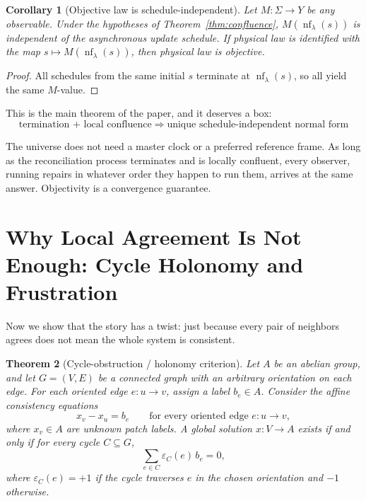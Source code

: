 \documentclass[11pt]{article}
\newtheorem{theorem}{Theorem}[section]
\newtheorem{corollary}[theorem]{Corollary}
\begin{document}
\begin{corollary}[Objective law is schedule-independent]\label{cor:objective}
Let $M:\Sigma\to Y$ be any observable. Under the hypotheses of Theorem~\ref{thm:confluence}, $M(\operatorname{nf}_\lambda(s))$ is independent of the asynchronous update schedule. If physical law is identified with the map $s\mapsto M(\operatorname{nf}_\lambda(s))$, then physical law is objective.
\end{corollary}

\begin{proof}
All schedules from the same initial $s$ terminate at $\operatorname{nf}_\lambda(s)$, so all yield the same $M$-value.
\end{proof}

This is the main theorem of the paper, and it deserves a box:
\[
\boxed{\text{termination + local confluence} \;\Longrightarrow\; \text{unique schedule-independent normal form}}
\]

The universe does not need a master clock or a preferred reference frame. As long as the reconciliation process terminates and is locally confluent, every observer, running repairs in whatever order they happen to run them, arrives at the same answer. Objectivity is a convergence guarantee.


\section{Why Local Agreement Is Not Enough: Cycle Holonomy and Frustration}

Now we show that the story has a twist: just because every pair of neighbors agrees does not mean the whole system is consistent.

\begin{theorem}[Cycle-obstruction / holonomy criterion]\label{thm:holonomy}
Let $A$ be an abelian group, and let $G=(V,E)$ be a connected graph with an arbitrary orientation on each edge. For each oriented edge $e:u\to v$, assign a label $b_e\in A$. Consider the affine consistency equations
\[
x_v - x_u = b_e
\qquad
\text{for every oriented edge } e:u\to v,
\]
where $x_v\in A$ are unknown patch labels. A global solution $x:V\to A$ exists if and only if for every cycle $C\subseteq G$,
\[
\sum_{e\in C}\varepsilon_C(e)\, b_e = 0,
\]
where $\varepsilon_C(e)=+1$ if the cycle traverses $e$ in the chosen orientation and $-1$ otherwise.
\end{theorem}
\end{document}
